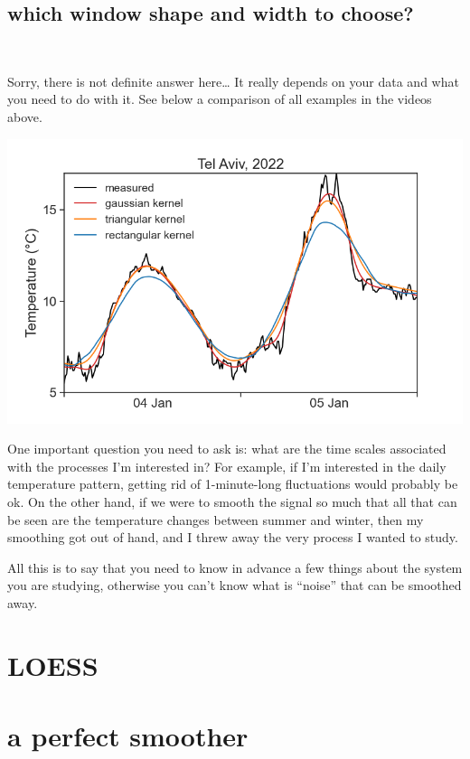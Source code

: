\documentclass[
  letterpaper,
  DIV=11,
  numbers=noendperiod,
  oneside]{scrreprt}
\begin{document}
\hypertarget{which-window-shape-and-width-to-choose}{%
\section{which window shape and width to
choose?}\label{which-window-shape-and-width-to-choose}}

🤷‍♂️

Sorry, there is not definite answer here\ldots{} It really depends on
your data and what you need to do with it. See below a comparison of all
examples in the videos above.

\includegraphics{smoothing/kernel_comparison.png}

One important question you need to ask is: what are the time scales
associated with the processes I'm interested in? For example, if I'm
interested in the daily temperature pattern, getting rid of
1-minute-long fluctuations would probably be ok. On the other hand, if
we were to smooth the signal so much that all that can be seen are the
temperature changes between summer and winter, then my smoothing got out
of hand, and I threw away the very process I wanted to study.

All this is to say that you need to know in advance a few things about
the system you are studying, otherwise you can't know what is ``noise''
that can be smoothed away.

\hypertarget{loess}{%
\chapter{LOESS}\label{loess}}

\hypertarget{a-perfect-smoother}{%
\chapter{a perfect smoother}\label{a-perfect-smoother}}
\end{document}
